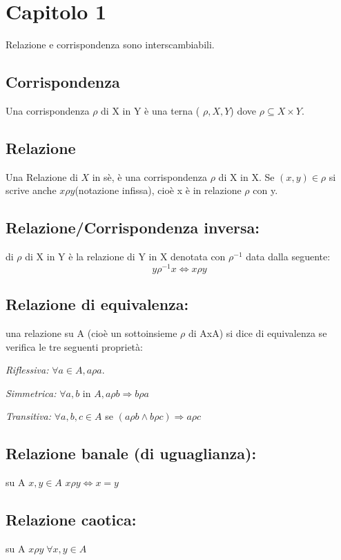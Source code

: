 \section{Capitolo 1}
Relazione e corrispondenza sono interscambiabili.

\subsection{Corrispondenza}
Una corrispondenza \(\rho\) di X in Y è una terna ( \(\rho, X, Y\)) dove \(\rho \subseteq X\times Y\).

\subsection{Relazione}
Una Relazione di \(X\) in sè, è una corrispondenza \(\rho\) di X in X.
Se \((x, y) \in\rho\) si scrive anche \(x\rho y\)(notazione infissa), cioè x è in relazione \(\rho\) con y.

\subsection{Relazione/Corrispondenza inversa:} di \(\rho\) di X in Y è la relazione di Y in X denotata con \(\rho ^{-1}\) data dalla seguente:
\[y\rho^{-1}x \Leftrightarrow x\rho y\]
\subsection{Relazione di equivalenza:} una relazione su A (cioè un sottoinsieme \(\rho\) di AxA) si dice di equivalenza se verifica le tre seguenti proprietà:

\textit{Riflessiva:} \(\forall a \in A, a\rho a\).

\textit{Simmetrica:} \(\forall a,b\) in \(A, a\rho b \Rightarrow b\rho a\)

\textit{Transitiva:} \(\forall a, b, c \in A\) se \((a\rho b \wedge b\rho c) \Rightarrow a\rho c\)

\subsection{Relazione banale (di uguaglianza):} su A \(x, y \in A\) \(x\rho y \Leftrightarrow x=y\)

\subsection{Relazione caotica:} su A \(x\rho y\; \forall x,y \in A\)

